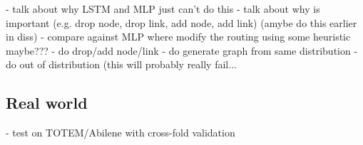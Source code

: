 - talk about why LSTM and MLP just can't do this
- talk about why is important (e.g. drop node, drop link, add node, add link) (amybe do this earlier in diss)
- compare against MLP where modify the routing using some heuristic maybe???
- do drop/add node/link
- do generate graph from same distribution
- do out of distribution (this will probably really fail...

\subsection{Real world}

- test on TOTEM/Abilene with cross-fold validation
